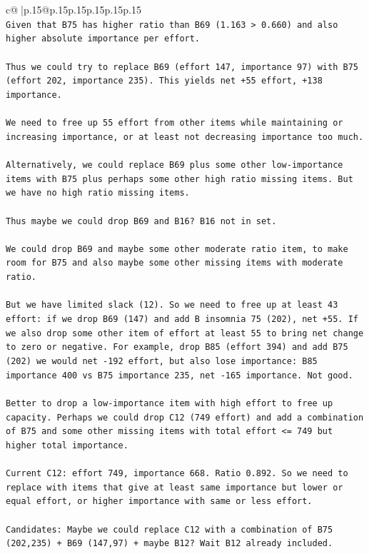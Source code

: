 \documentclass{article}
\begin{document}
{\begin{supertabular}{c@{$\;$}|p{.15\linewidth}@{}p{.15\linewidth}p{.15\linewidth}p{.15\linewidth}p{.15\linewidth}p{.15\linewidth}}
{{{\\ 
\texttt{Given that B75 has higher ratio than B69 (1.163 > 0.660) and also higher absolute importance per effort.} \\
\\ 
\texttt{Thus we could try to replace B69 (effort 147, importance 97) with B75 (effort 202, importance 235). This yields net +55 effort, +138 importance.} \\
\\ 
\texttt{We need to free up 55 effort from other items while maintaining or increasing importance, or at least not decreasing importance too much.} \\
\\ 
\texttt{Alternatively, we could replace B69 plus some other low{-}importance items with B75 plus perhaps some other high ratio missing items. But we have no high ratio missing items.} \\
\\ 
\texttt{Thus maybe we could drop B69 and B16? B16 not in set.} \\
\\ 
\texttt{We could drop B69 and maybe some other moderate ratio item, to make room for B75 and also maybe some other missing items with moderate ratio.} \\
\\ 
\texttt{But we have limited slack (12). So we need to free up at least 43 effort: if we drop B69 (147) and add B insomnia 75 (202), net +55. If we also drop some other item of effort at least 55 to bring net change to zero or negative. For example, drop B85 (effort 394) and add B75 (202) we would net {-}192 effort, but also lose importance: B85 importance 400 vs B75 importance 235, net {-}165 importance. Not good.} \\
\\ 
\texttt{Better to drop a low{-}importance item with high effort to free up capacity. Perhaps we could drop C12 (749 effort) and add a combination of B75 and some other missing items with total effort <= 749 but higher total importance.} \\
\\ 
\texttt{Current C12: effort 749, importance 668. Ratio 0.892. So we need to replace with items that give at least same importance but lower or equal effort, or higher importance with same or less effort.} \\
\\ 
\texttt{Candidates: Maybe we could replace C12 with a combination of B75 (202,235) + B69 (147,97) + maybe B12? Wait B12 already included.} \\
}}}
\end{supertabular}}
\end{document}
